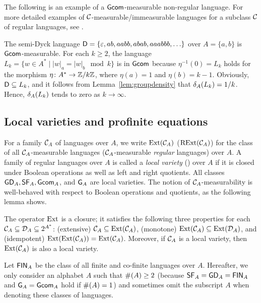 The following is an example of a \(\mathsf{Gcom}\)-measurable non-regular language.
For more detailed examples of \({\cal C}\)-measurable/immeasurable languages for a subclass \({\cal C}\) of regular languages, see \cite{S2021,carathe,gcommeasure}.

\begin{example}[\cite{S2021}]\label{ex:dyck2}
 The semi-Dyck language \(\mathsf{D} = \{\varepsilon, ab, aabb, abab, aaabbb, \ldots\}\) over \(A = \{a,b\}\) is \(\mathsf{Gcom}\)-measurable.
 For each \(k \geq 2\), the language \(L_k = \{ w \in A^* \mid |w|_a = |w|_b \mod k \}\) is in \(\mathsf{Gcom}\) because 
 \(\eta^{-1}(0) = L_k\) holds for the morphism \(\eta\colon A^* \rightarrow \mathbb{Z} / k \mathbb{Z}\), where \(\eta(a) = 1\) and \(\eta(b) = k-1\).
 Obviously, \(\mathsf{D} \subseteq L_k\), and it follows from Lemma~\ref{lem:groupdensity} that
 \(\delta_{A}(L_k) = 1/k\). Hence, \(\delta_{A}(L_k)\) tends to zero as \(k \to \infty\).
\end{example}

\subsection{Local varieties and profinite equations}
For a family \({\cal C}_A\) of languages over \(A\), we write
\(\mathrm{Ext}({\cal C}_A)\) (\resp \(\mathrm{RExt}({\cal C}_A)\)) for the class of all \({\cal C}_A\)-measurable languages (\resp \({\cal C}_A\)-measurable \emph{regular} languages) over \(A\).
A family of regular languages over \(A\) is called a \emph{local variety} (\cf \cite{Adamek}) over \(A\) if it is closed under 
 Boolean operations as well as left and right quotients.
All classes \(\mathsf{GD}_A, \mathsf{SF}_A, \mathsf{Gcom}_A\), and \(\mathsf{G}_A\) are local varieties.
The notion of \({\cal C}_A\)-measurability is well-behaved with respect to Boolean operations and quotients, as the following lemma shows.
\begin{lemma}\label{lem:closure}
The operator \(\mathrm{Ext}\) is a closure;
 \ie it satisfies the following three properties for each \({\cal C}_A \subseteq {\cal D}_A \subseteq 2^{A^*}\):
 (extensive)  \({\cal C}_A \subseteq \mathrm{Ext}({\cal C}_A)\),
 (monotone) \(\mathrm{Ext}({\cal C}_A) \subseteq \mathrm{Ext}({\cal D}_A)\), and
 (idempotent) \(\mathrm{Ext}(\mathrm{Ext}({\cal C}_A)) = \mathrm{Ext}({\cal C}_A)\).
Moreover, 
if \({\cal C}_A\) is a local variety, then \(\mathrm{Ext}({\cal C}_A)\) is also a local variety.
\end{lemma}

Let \(\mathsf{FIN}_A\) be the class of all finite and co-finite languages over \(A\).
Hereafter, we only consider an alphabet \(A\) such that \(\#\!\left(A\right) \geq 2\) (because \(\mathsf{SF}_A = \mathsf{GD}_A = \mathsf{FIN}_A\) and \(\mathsf{G}_A = \mathsf{Gcom}_A\) hold if \(\#\!\left(A\right) = 1\)) and sometimes omit the subscript \(A\) when denoting these classes of languages.

